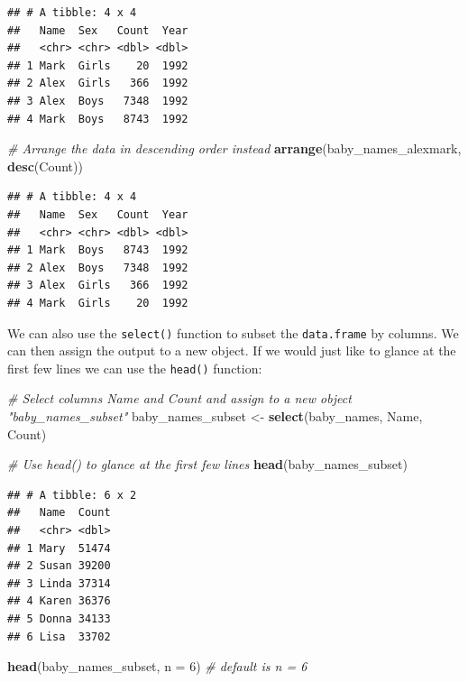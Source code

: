\documentclass[
]{book}
\newenvironment{Shaded}{\begin{snugshade}}{\end{snugshade}}
\newcommand{\CommentTok}[1]{\textcolor[rgb]{0.56,0.35,0.01}{\textit{#1}}}
\newcommand{\DataTypeTok}[1]{\textcolor[rgb]{0.13,0.29,0.53}{#1}}
\newcommand{\DecValTok}[1]{\textcolor[rgb]{0.00,0.00,0.81}{#1}}
\newcommand{\KeywordTok}[1]{\textcolor[rgb]{0.13,0.29,0.53}{\textbf{#1}}}
\newcommand{\NormalTok}[1]{#1}
\newcommand{\StringTok}[1]{\textcolor[rgb]{0.31,0.60,0.02}{#1}}
\begin{document}
\begin{verbatim}
## # A tibble: 4 x 4
##   Name  Sex   Count  Year
##   <chr> <chr> <dbl> <dbl>
## 1 Mark  Girls    20  1992
## 2 Alex  Girls   366  1992
## 3 Alex  Boys   7348  1992
## 4 Mark  Boys   8743  1992
\end{verbatim}

\begin{Shaded}
\begin{Highlighting}[]
\CommentTok{\# Arrange the data in descending order instead}
\KeywordTok{arrange}\NormalTok{(baby\_names\_alexmark, }\KeywordTok{desc}\NormalTok{(Count))}
\end{Highlighting}
\end{Shaded}

\begin{verbatim}
## # A tibble: 4 x 4
##   Name  Sex   Count  Year
##   <chr> <chr> <dbl> <dbl>
## 1 Mark  Boys   8743  1992
## 2 Alex  Boys   7348  1992
## 3 Alex  Girls   366  1992
## 4 Mark  Girls    20  1992
\end{verbatim}

We can also use the \texttt{select()} function to subset the \texttt{data.frame} by columns. We can then assign the output to a new object. If we would just like to glance at the first few lines we can use the \texttt{head()} function:

\begin{Shaded}
\begin{Highlighting}[]
\CommentTok{\# Select columns Name and Count and assign to a new object "baby\_names\_subset"}
\NormalTok{baby\_names\_subset \textless{}{-}}\StringTok{ }\KeywordTok{select}\NormalTok{(baby\_names, Name, Count)}

\CommentTok{\# Use head() to glance at the first few lines}
\KeywordTok{head}\NormalTok{(baby\_names\_subset)}
\end{Highlighting}
\end{Shaded}

\begin{verbatim}
## # A tibble: 6 x 2
##   Name  Count
##   <chr> <dbl>
## 1 Mary  51474
## 2 Susan 39200
## 3 Linda 37314
## 4 Karen 36376
## 5 Donna 34133
## 6 Lisa  33702
\end{verbatim}

\begin{Shaded}
\begin{Highlighting}[]
\KeywordTok{head}\NormalTok{(baby\_names\_subset, }\DataTypeTok{n =} \DecValTok{6}\NormalTok{) }\CommentTok{\# default is n = 6}
\end{Highlighting}
\end{Shaded}
\end{document}
